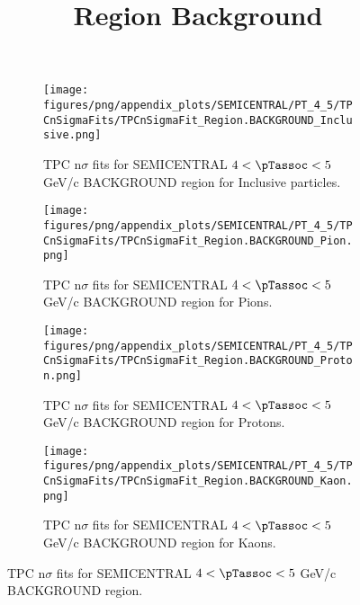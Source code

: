            \begin{figure}[H]
                \title{Region Background}
                \begin{subfigure}[b]{0.5\textwidth}
                    \centering
                    \texttt{[image: figures/png/appendix\_plots/SEMICENTRAL/PT\_4\_5/TPCnSigmaFits/TPCnSigmaFit\_Region.BACKGROUND\_Inclusive.png]}
                    \caption{TPC n$\sigma$ fits for SEMICENTRAL $4 < \pTassoc < 5$ GeV/c BACKGROUND region for Inclusive particles.}
                    \label{fig:appendix_SEMICENTRAL_$4 < \pTassoc < 5$ GeV/c_BACKGROUND_Inclusive}
                \end{subfigure}
                \begin{subfigure}[b]{0.5\textwidth}
                    \centering
                    \texttt{[image: figures/png/appendix\_plots/SEMICENTRAL/PT\_4\_5/TPCnSigmaFits/TPCnSigmaFit\_Region.BACKGROUND\_Pion.png]}
                    \caption{TPC n$\sigma$ fits for SEMICENTRAL $4 < \pTassoc < 5$ GeV/c BACKGROUND region for Pions.}
                    \label{fig:appendix_SEMICENTRAL_$4 < \pTassoc < 5$ GeV/c_BACKGROUND_Pion}
                \end{subfigure}
                \begin{subfigure}[b]{0.5\textwidth}
                    \centering
                    \texttt{[image: figures/png/appendix\_plots/SEMICENTRAL/PT\_4\_5/TPCnSigmaFits/TPCnSigmaFit\_Region.BACKGROUND\_Proton.png]}
                    \caption{TPC n$\sigma$ fits for SEMICENTRAL $4 < \pTassoc < 5$ GeV/c BACKGROUND region for Protons.}
                    \label{fig:appendix_SEMICENTRAL_$4 < \pTassoc < 5$ GeV/c_BACKGROUND_Proton}
                \end{subfigure}
                \begin{subfigure}[b]{0.5\textwidth}
                    \centering
                    \texttt{[image: figures/png/appendix\_plots/SEMICENTRAL/PT\_4\_5/TPCnSigmaFits/TPCnSigmaFit\_Region.BACKGROUND\_Kaon.png]}
                    \caption{TPC n$\sigma$ fits for SEMICENTRAL $4 < \pTassoc < 5$ GeV/c BACKGROUND region for Kaons.}
                    \label{fig:appendix_SEMICENTRAL_$4 < \pTassoc < 5$ GeV/c_BACKGROUND_Kaon}
                \end{subfigure}
                \caption{TPC n$\sigma$ fits for SEMICENTRAL $4 < \pTassoc < 5$ GeV/c BACKGROUND region.}
                \label{fig:appendix_SEMICENTRAL_$4 < \pTassoc < 5$ GeV/c_BACKGROUND}
            \end{figure}
            \clearpage
            
